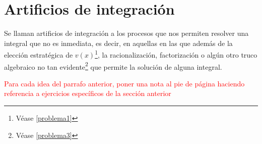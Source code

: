 \section{Artificios de integración}\label{sec4}
Se llaman artificios de integración a los procesos que nos permiten resolver una integral que no es inmediata, es decir, en aquellas en las que además de la elección estratégica de $v(x)$\footnote{Véase \cref{problema1}}, la racionalización, factorización o algún otro truco algebraico no tan evidente\footnote{Véase \cref{problema3}} que permite la solución de alguna integral.

\textcolor{red}{Para cada idea del parrafo anterior, poner una nota al pie de página haciendo referencia a ejercicios específicos de la sección anterior}











